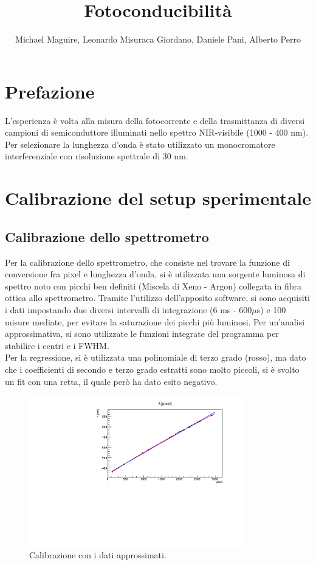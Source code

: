 \documentclass[11pt]{article} %
\title{Fotoconducibilità}
\author{Michael Maguire, Leonardo Misuraca Giordano, Daniele Pani, Alberto Perro}
\begin{document}
\maketitle
\newpage
\section*{Prefazione}
L'esperienza è volta alla misura della fotocorrente e della trasmittanza di diversi campioni di semiconduttore illuminati nello spettro NIR-visibile (1000 - 400 nm). Per selezionare la lunghezza d'onda è stato utilizzato un monocromatore interferenziale con risoluzione spettrale di 30 nm.
\section{Calibrazione del setup sperimentale}
\subsection{Calibrazione dello spettrometro}
Per la calibrazione dello spettrometro, che consiste nel trovare la funzione di conversione fra pixel e lunghezza d'onda, si è utilizzata una sorgente luminosa di spettro noto con picchi ben definiti (Miscela di Xeno - Argon) collegata in fibra ottica allo spettrometro.
Tramite l'utilizzo dell'apposito software, si sono acquisiti i dati impostando due diversi intervalli di integrazione (6 ms - 600$\mu$s) e 100 misure mediate, per evitare la saturazione dei picchi più luminosi. Per un'analisi approssimativa, si sono utilizzate le funzioni integrate del programma per stabilire i centri e i FWHM.\\Per la regressione, si è utilizzata una polinomiale di terzo grado (rosso), ma dato che i coefficienti di secondo e terzo grado estratti sono molto piccoli, si è svolto un fit con una retta, il quale però ha dato esito negativo.
\begin{figure}[h!]
\begin{center}
\includegraphics[width=350px]{img/cal_approx.pdf}
\caption{Calibrazione con i dati approssimati.}
\end{center}
\end{figure}
\end{document}
